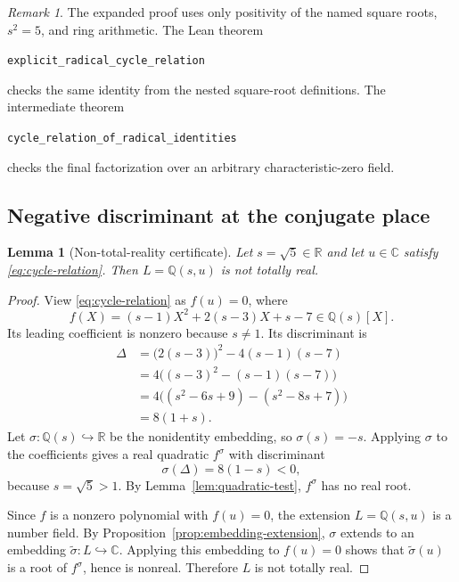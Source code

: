 \documentclass[11pt]{article}
\numberwithin{equation}{section}
\newtheorem{lemma}[theorem]{Lemma}
\theoremstyle{definition}
\theoremstyle{remark}
\newtheorem{remark}[theorem]{Remark}
\newcommand{\Q}{\mathbb{Q}}
\newcommand{\R}{\mathbb{R}}
\newcommand{\C}{\mathbb{C}}
\newcommand{\code}[1]{\texttt{#1}}
\begin{document}
\begin{remark}
The expanded proof uses only positivity of the named square roots,
\(s^2=5\), and ring arithmetic.  The Lean theorem
\begin{center}
\code{explicit\_radical\_cycle\_relation}
\end{center}
checks the same identity from the nested square-root definitions.  The
intermediate theorem
\begin{center}
\code{cycle\_relation\_of\_radical\_identities}
\end{center}
checks the final factorization over an arbitrary characteristic-zero field.
\end{remark}

\subsection{Negative discriminant at the conjugate place}

\begin{lemma}[Non-total-reality certificate]
\label{lem:non-real-subfield}
Let \(s=\sqrt5\in\R\) and let \(u\in\C\) satisfy \eqref{eq:cycle-relation}.  Then
\(L=\Q(s,u)\) is not totally real.
\end{lemma}

\begin{proof}
View \eqref{eq:cycle-relation} as \(f(u)=0\), where
\[
 f(X)=(s-1)X^2+2(s-3)X+s-7\in\Q(s)[X].
\]
Its leading coefficient is nonzero because \(s\ne1\).  Its discriminant is
\begin{equation}
\begin{aligned}
 \Delta
 &=\bigl(2(s-3)\bigr)^2-4(s-1)(s-7)\\
 &=4\bigl((s-3)^2-(s-1)(s-7)\bigr)\\
 &=4\bigl((s^2-6s+9)-(s^2-8s+7)\bigr)\\
 &=8(1+s).
\end{aligned}
\label{eq:discriminant}
\end{equation}
Let \(\sigma:\Q(s)\hookrightarrow\R\) be the nonidentity embedding, so
\(\sigma(s)=-s\).  Applying \(\sigma\) to the coefficients gives a real
quadratic \(f^\sigma\) with discriminant
\begin{equation}
 \sigma(\Delta)=8(1-s)<0,
\label{eq:negative-discriminant}
\end{equation}
because \(s=\sqrt5>1\).  By Lemma~\ref{lem:quadratic-test},
\(f^\sigma\) has no real root.

Since \(f\) is a nonzero polynomial with \(f(u)=0\), the extension
\(L=\Q(s,u)\) is a number field.  By
Proposition~\ref{prop:embedding-extension}, \(\sigma\) extends to an
embedding \(\widetilde\sigma:L\hookrightarrow\C\).  Applying this
embedding to \(f(u)=0\) shows that \(\widetilde\sigma(u)\) is a root of
\(f^\sigma\), hence is nonreal.  Therefore \(L\) is not totally real.
\end{proof}
\end{document}
